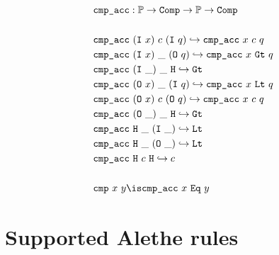 \begin{definition}[cmp]\label{def:cmp-pos}
\begin{align*}
& \kw{cmp\_acc} : \bb{P} \ra \kw{Comp} \ra \bb{P} \ra \kw{Comp} \\
\\
& \kw{cmp\_acc}~(\kw{I}~x)~c~(\kw{I}~q) \re \kw{cmp\_acc}~x~c~q \\
& \kw{cmp\_acc}~(\kw{I}~x)~\_~(\kw{O}~q) \re \kw{cmp\_acc}~x~\kw{Gt}~q \\
& \kw{cmp\_acc}~(\kw{I}~\_)~\_~\kw{H} \re \kw{Gt} \\
& \kw{cmp\_acc}~(\kw{O}~x)~\_~(\kw{I}~q) \re \kw{cmp\_acc}~x~\kw{Lt}~q \\
& \kw{cmp\_acc}~(\kw{O}~x)~c~(\kw{O}~q) \re \kw{cmp\_acc}~x~c~q \\
& \kw{cmp\_acc}~(\kw{O}~\_)~\_~\kw{H} \re \kw{Gt} \\
& \kw{cmp\_acc}~\kw{H}~\_~(\kw{I}~\_) \re \kw{Lt} \\
& \kw{cmp\_acc}~\kw{H}~\_~(\kw{O}~\_) \re \kw{Lt} \\
& \kw{cmp\_acc}~\kw{H}~c~\kw{H} \re c \\
\\
& \kw{cmp}~x~y \is \kw{cmp\_acc}~x~\kw{Eq}~y
\end{align*}
\end{definition}

\section{Supported Alethe rules}
\label{app:alethe-rules-supported}


